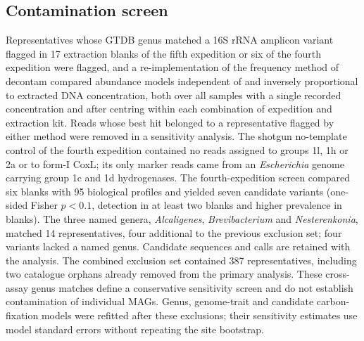 \subsection*{Contamination screen}
Representatives whose GTDB genus matched a 16S rRNA amplicon variant flagged in 17
extraction blanks of the fifth expedition or six of the fourth expedition were flagged, and a re-implementation of the frequency method of
decontam \citep{davis2018decontam} compared abundance models independent of and inversely proportional to
extracted DNA concentration, both over all samples with a single recorded concentration and after centring
within each combination of expedition and extraction kit. Reads whose best hit belonged to a
representative flagged by either method were removed in a sensitivity analysis. The shotgun no-template
control of the fourth expedition contained no reads assigned to groups 1l, 1h or 2a or to form-I CoxL; its
only marker reads came from an \textit{Escherichia} genome carrying group 1c and 1d hydrogenases.
The fourth-expedition screen compared six blanks with 95 biological profiles and yielded seven candidate
variants (one-sided Fisher $p<0.1$, detection in at least two blanks and higher prevalence in blanks).
The three named genera, \textit{Alcaligenes}, \textit{Brevibacterium} and \textit{Nesterenkonia}, matched
14 representatives, four additional to the previous exclusion set; four variants lacked a named genus.
Candidate sequences and calls are retained with the analysis. The combined exclusion set contained 387
representatives, including two catalogue orphans already removed from the primary analysis.
These cross-assay genus matches define a conservative sensitivity screen and do not establish contamination
of individual MAGs. Genus, genome-trait and candidate carbon-fixation models were refitted after these
exclusions; their sensitivity estimates use model standard errors without repeating the site bootstrap.

